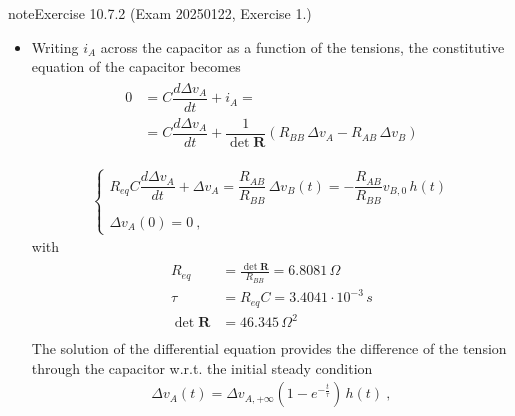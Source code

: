 \documentclass[letterpaper,10pt,italian]{jupyterBook}
\begin{document}
\begin{sphinxadmonition}{note}{Exercise 10.7.2 (Exam 2025\sphinxhyphen{}01\sphinxhyphen{}22, Exercise 1.)}
\begin{itemize}
\begin{equation*}
\end{equation*}
\item {} 
\sphinxAtStartPar
{} Writing \(i_A\) across the capacitor as a function of the tensions, the constitutive equation of the capacitor becomes
\begin{equation*}
\begin{split}\begin{aligned}
  0 & = C \dfrac{d \Delta v_A}{d t} + i_A = \\
    & = C \dfrac{d \Delta v_A}{d t} + \dfrac{1}{\det \mathbf{R}} \left( R_{BB} \, \Delta v_A - R_{AB} \, \Delta v_B \right)  \\ \\
   \end{aligned}\end{split}
\end{equation*}\begin{equation*}
\begin{split}\begin{cases}
      R_{eq} C \dfrac{d \Delta v_A}{d t} + \Delta v_A = \dfrac{ R_{AB} }{ R_{BB} } \, \Delta v_B(t) = - \dfrac{ R_{AB} }{ R_{BB} } v_{B,0} \, h(t)  \\ \\
      \Delta v_A(0) = 0 \ ,
   \end{cases}\end{split}
\end{equation*}
\sphinxAtStartPar
with
\begin{equation*}
\begin{split}\begin{aligned}
     R_{eq} & = \frac{\det \mathbf{R}}{R_{BB}} = 6.8081 \, \Omega \\
     \tau & = R_{eq} C = 3.4041 \cdot 10^{-3} \, s \\
     \det \mathbf{R} & = 46.345 \, \Omega^2 \\
   \end{aligned}\end{split}
\end{equation*}
\sphinxAtStartPar
The solution of the differential equation provides the difference of the tension through the capacitor w.r.t. the initial steady condition
\begin{equation*}
\begin{split}\Delta v_A(t) = \Delta v_{A,+\infty} \left( 1 - e^{-\frac{t}{\tau}} \right) \, h(t) \ ,\end{split}
\end{equation*}

\end{itemize}
\end{sphinxadmonition}
\end{document}
